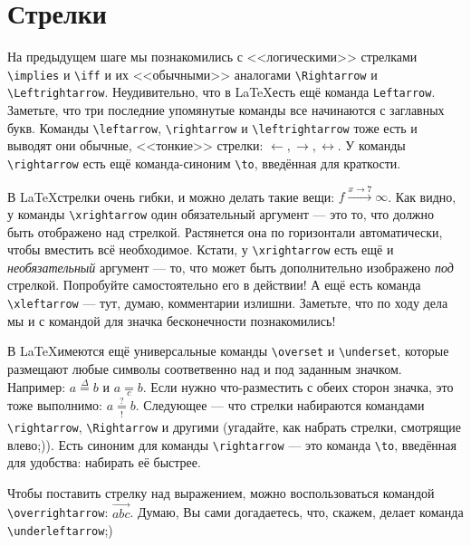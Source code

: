 \section{Стрелки}
\par На предыдущем шаге мы познакомились с <<логическими>> стрелками \verb"\implies" и \verb"\iff" и их <<обычными>> аналогами \verb"\Rightarrow" и \verb"\Leftrightarrow". Неудивительно, что в \LaTeX есть ещё команда \verb"Leftarrow". Заметьте, что три последние упомянутые команды все начинаются с заглавных букв. Команды \verb"\leftarrow", \verb"\rightarrow" и \verb"\leftrightarrow" тоже есть и выводят они обычные, <<тонкие>> стрелки: \(\leftarrow,\rightarrow,\leftrightarrow\). У команды \verb"\rightarrow" есть ещё команда-синоним \verb"\to", введённая для краткости.

\par В \LaTeX стрелки очень гибки, и можно делать такие вещи: \( f\xrightarrow{x\rightarrow 7}\infty \). Как видно, у команды \verb"\xrightarrow" один обязательный аргумент --- это то, что должно быть отображено над стрелкой. Растянется она по горизонтали автоматически, чтобы вместить всё необходимое. Кстати, у \verb"\xrightarrow" есть ещё и \emph{необязательный} аргумент --- то, что может быть дополнительно изображено \emph{под} стрелкой. Попробуйте самостоятельно его в действии! А ещё есть команда \verb"\xleftarrow" --- тут, думаю, комментарии излишни. Заметьте, что по ходу дела мы и с командой для значка бесконечности познакомились!
\par В \LaTeX имеются ещё универсальные команды \verb"\overset" и \verb"\underset", которые размещают любые символы соответвенно над и под заданным значком. Например: \( a \overset{\Delta}{=} b \) и \( a \underset{c}{=} b \). Если нужно что-разместить с обеих сторон значка, это тоже выполнимо: \( a \underset{!}{\overset{?}{=}} b \).
Следующее --- что стрелки набираются командами \verb"\rightarrow", \verb"\Rightarrow" и другими (угадайте, как набрать стрелки, смотрящие влево;)). Есть синоним для команды \verb"\rightarrow" --- это команда \verb"\to", введённая для удобства: набирать её быстрее.

\par Чтобы поставить стрелку над выражением, можно воспользоваться командой \verb"\overrightarrow": \(\overrightarrow{abc}\). Думаю, Вы сами догадаетесь, что, скажем, делает команда \verb"\underleftarrow";)


